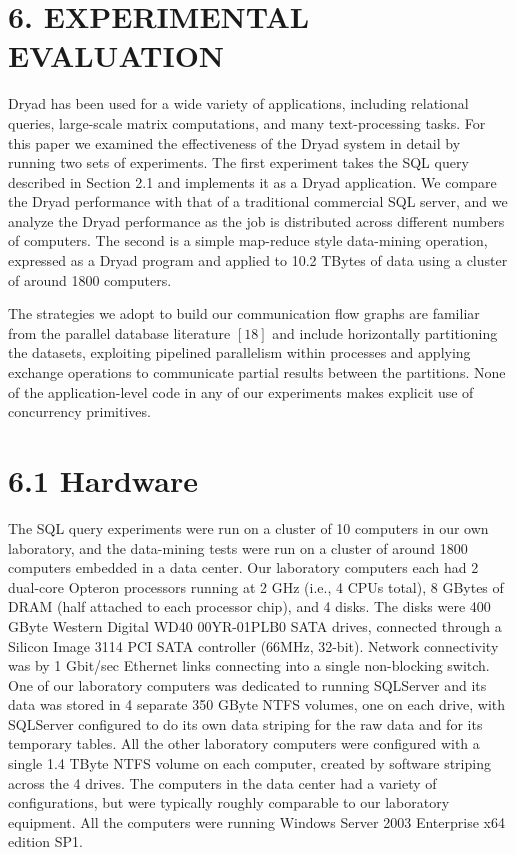 \documentclass[
]{article}
\begin{document}
\section{6. EXPERIMENTAL EVALUATION}\label{experimental-evaluation}

Dryad has been used for a wide variety of applications, including
relational queries, large-scale matrix computations, and many
text-processing tasks. For this paper we examined the effectiveness of
the Dryad system in detail by running two sets of experiments. The first
experiment takes the SQL query described in Section 2.1 and implements
it as a Dryad application. We compare the Dryad performance with that of
a traditional commercial SQL server, and we analyze the Dryad
performance as the job is distributed across different numbers of
computers. The second is a simple map-reduce style data-mining
operation, expressed as a Dryad program and applied to 10.2 TBytes of
data using a cluster of around 1800 computers.

The strategies we adopt to build our communication flow graphs are
familiar from the parallel database literature \([18]\) and include
horizontally partitioning the datasets, exploiting pipelined parallelism
within processes and applying exchange operations to communicate partial
results between the partitions. None of the application-level code in
any of our experiments makes explicit use of concurrency primitives.

\section{6.1 Hardware}\label{hardware}

The SQL query experiments were run on a cluster of 10 computers in our
own laboratory, and the data-mining tests were run on a cluster of
around 1800 computers embedded in a data center. Our laboratory
computers each had 2 dual-core Opteron processors running at 2 GHz
(i.e., 4 CPUs total), 8 GBytes of DRAM (half attached to each processor
chip), and 4 disks. The disks were 400 GByte Western Digital WD40
00YR-01PLB0 SATA drives, connected through a Silicon Image 3114 PCI SATA
controller (66MHz, 32-bit). Network connectivity was by 1 Gbit/sec
Ethernet links connecting into a single non-blocking switch. One of our
laboratory computers was dedicated to running SQLServer and its data was
stored in 4 separate 350 GByte NTFS volumes, one on each drive, with
SQLServer configured to do its own data striping for the raw data and
for its temporary tables. All the other laboratory computers were
configured with a single 1.4 TByte NTFS volume on each computer, created
by software striping across the 4 drives. The computers in the data
center had a variety of configurations, but were typically roughly
comparable to our laboratory equipment. All the computers were running
Windows Server 2003 Enterprise x64 edition SP1.
\end{document}
